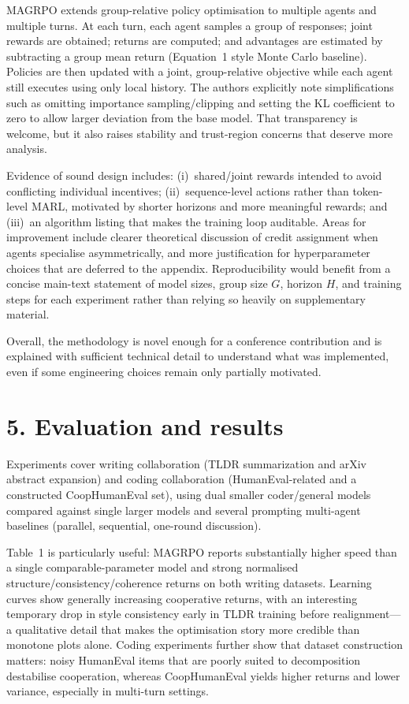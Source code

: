 \documentclass[11pt,a4paper]{article}
\begin{document}
MAGRPO extends group-relative policy optimisation to multiple agents and multiple turns. At each turn, each agent samples a group of responses; joint rewards are obtained; returns are computed; and advantages are estimated by subtracting a group mean return (Equation~1 style Monte Carlo baseline). Policies are then updated with a joint, group-relative objective while each agent still executes using only local history. The authors explicitly note simplifications such as omitting importance sampling/clipping and setting the KL coefficient to zero to allow larger deviation from the base model. That transparency is welcome, but it also raises stability and trust-region concerns that deserve more analysis.

Evidence of sound design includes: (i)~shared/joint rewards intended to avoid conflicting individual incentives; (ii)~sequence-level actions rather than token-level MARL, motivated by shorter horizons and more meaningful rewards; and (iii)~an algorithm listing that makes the training loop auditable. Areas for improvement include clearer theoretical discussion of credit assignment when agents specialise asymmetrically, and more justification for hyperparameter choices that are deferred to the appendix. Reproducibility would benefit from a concise main-text statement of model sizes, group size $G$, horizon $H$, and training steps for each experiment rather than relying so heavily on supplementary material.

Overall, the methodology is novel enough for a conference contribution and is explained with sufficient technical detail to understand what was implemented, even if some engineering choices remain only partially motivated.

\section*{5. Evaluation and results}
Experiments cover writing collaboration (TLDR summarization and arXiv abstract expansion) and coding collaboration (HumanEval-related and a constructed CoopHumanEval set), using dual smaller coder/general models compared against single larger models and several prompting multi-agent baselines (parallel, sequential, one-round discussion).

Table~1 is particularly useful: MAGRPO reports substantially higher speed than a single comparable-parameter model and strong normalised structure/consistency/coherence returns on both writing datasets. Learning curves show generally increasing cooperative returns, with an interesting temporary drop in style consistency early in TLDR training before realignment---a qualitative detail that makes the optimisation story more credible than monotone plots alone. Coding experiments further show that dataset construction matters: noisy HumanEval items that are poorly suited to decomposition destabilise cooperation, whereas CoopHumanEval yields higher returns and lower variance, especially in multi-turn settings.
\end{document}
